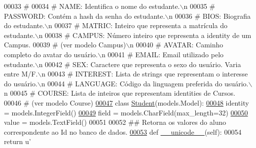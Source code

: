 \begin{DoxyCode}
00033 \textcolor{comment}{#   }
00034 \textcolor{comment}{#   NAME:       Identifica o nome do estudante.\(\backslash\)n}
00035 \textcolor{comment}{#   PASSWORD:   Contém a hash da senha do estudante.\(\backslash\)n}
00036 \textcolor{comment}{#   BIOS:       Biografia do estudante.\(\backslash\)n}
00037 \textcolor{comment}{#   MATRIC:     Inteiro que representa a matrícula do estudante.\(\backslash\)n}
00038 \textcolor{comment}{#   CAMPUS:     Número inteiro que representa a identity de um Campus.}
00039 \textcolor{comment}{#                   (ver modelo Campus)\(\backslash\)n}
00040 \textcolor{comment}{#   AVATAR:     Caminho completo do avatar do usuário.\(\backslash\)n}
00041 \textcolor{comment}{#   EMAIL:      Email utilizado pelo estudante.\(\backslash\)n}
00042 \textcolor{comment}{#   SEX:        Caractere que representa o sexo do usuário. Varia entre M/F.\(\backslash\)n}
00043 \textcolor{comment}{#   INTEREST:   Lista de strings que representam o interesse do usuário.\(\backslash\)n}
00044 \textcolor{comment}{#   LANGUAGE:   Código da linguagem preferida do usuário.\(\backslash\)n}
00045 \textcolor{comment}{#   COURSE:     Lista de inteiros que representam identities de Cursos.}
00046 \textcolor{comment}{#                   (ver modelo Course)}
\hypertarget{ELO_2models_8py_source_l00047}{}\hyperlink{classELO_1_1models_1_1Student}{00047} \textcolor{keyword}{class }\hyperlink{classELO_1_1models_1_1Student}{Student}(models.Model):
\hypertarget{ELO_2models_8py_source_l00048}{}\hyperlink{classELO_1_1models_1_1Student_a20a7789a2b0f5b7d0c98453dcf38bc4e}{00048}     identity = models.IntegerField()
\hypertarget{ELO_2models_8py_source_l00049}{}\hyperlink{classELO_1_1models_1_1Student_a893ec9b2ece5c6b829fce5e5a7c1d576}{00049}     field = models.CharField(max\_length=32)
\hypertarget{ELO_2models_8py_source_l00050}{}\hyperlink{classELO_1_1models_1_1Student_a201226779dce6e064cb16bd92ed016e2}{00050}     value = models.TextField()
00051 
00052     \textcolor{comment}{## Retorna os valores do aluno correspondente ao Id no banco de dados.}
\hypertarget{ELO_2models_8py_source_l00053}{}\hyperlink{classELO_1_1models_1_1Student_aed993e386d125c955def72680b441dd1}{00053}     \textcolor{keyword}{def }\hyperlink{classELO_1_1models_1_1Student_aed993e386d125c955def72680b441dd1}{\_\_unicode\_\_}(self):
00054         \textcolor{keywordflow}{return} \textcolor{stringliteral}{u'%
}
\end{DoxyCode}
